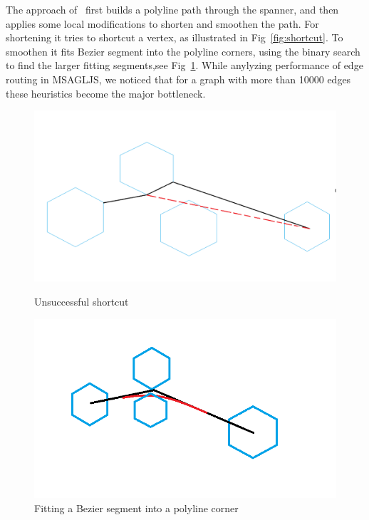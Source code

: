 \documentclass{gd-llncs}
\begin{document}
The approach of~\cite{dwyer2010fast} first builds a polyline path through the spanner, and then applies some local modifications to shorten and smoothen the path. For shortening it tries to shortcut a vertex, as illustrated in Fig~\ref{fig:shortcut}. To smoothen it fits Bezier segment into the polyline corners, using the binary search to find the larger fitting segments,see Fig~\ref{fig:cornerfit}. While anylyzing performance of edge routing in MSAGLJS, we noticed that for a graph with more than 10000 edges these heuristics become the major bottleneck.
\begin{figure}[!tbp]
  \centering
  \begin{minipage}[b]{0.4\textwidth}
    \includegraphics[width=\textwidth]{./naive_shorcut_now_working.png}
    \caption{Unsuccessful shortcut}
    \label{fig:shortcut}
  \end{minipage}
  \hfill
  \begin{minipage}[b]{0.4\textwidth}
    \includegraphics[width=\textwidth]{fillet_corner.png}
    \caption{Fitting a Bezier segment into a polyline corner}
    \label{fig:cornerfit}
  \end{minipage}

\end{figure}
\end{document}
